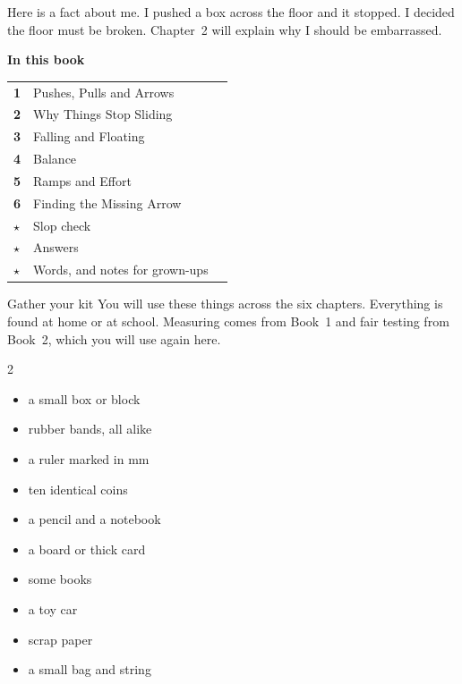 \begin{multix}[hmm]\multixbot[hmm]\tcblower
Here is a fact about me. I pushed a box across the floor and it stopped. I decided the floor must be broken. Chapter~2 will explain why I should be embarrassed.
\end{multix}
\clearpage

\thispagestyle{plain}
{\sans\bfseries\LARGE\color{ink} In this book}\par\vspace{0.2cm}
{\sans\large
\begin{tabular}{@{}p{0.9cm}p{7.6cm}r@{}}
\textcolor{tangerine}{\bfseries 1} & Pushes, Pulls and Arrows & \pageref{ch1}\\[3pt]
\textcolor{tangerine}{\bfseries 2} & Why Things Stop Sliding & \pageref{ch2}\\[3pt]
\textcolor{tangerine}{\bfseries 3} & Falling and Floating & \pageref{ch3}\\[3pt]
\textcolor{tangerine}{\bfseries 4} & Balance & \pageref{ch4}\\[3pt]
\textcolor{tangerine}{\bfseries 5} & Ramps and Effort & \pageref{ch5}\\[3pt]
\textcolor{tangerine}{\bfseries 6} & Finding the Missing Arrow & \pageref{ch6}\\[3pt]
\textcolor{sky}{\bfseries $\star$} & Slop check & \pageref{slop}\\[3pt]
\textcolor{sky}{\bfseries $\star$} & Answers & \pageref{answers}\\[3pt]
\textcolor{sky}{\bfseries $\star$} & Words, and notes for grown-ups & \pageref{notes}\\
\end{tabular}}

\begin{tryit}{Gather your kit}
You will use these things across the six chapters. Everything is found at home or at school. Measuring comes from Book~1 and fair testing from Book~2, which you will use again here.
\begin{multicols}{2}
\begin{itemize}[leftmargin=1.2em]
\item a small box or block
\item rubber bands, all alike
\item a ruler marked in mm
\item ten identical coins
\item a pencil and a notebook
\item a board or thick card
\item some books
\item a toy car
\item scrap paper
\item a small bag and string
\end{itemize}
\end{multicols}
\end{tryit}

